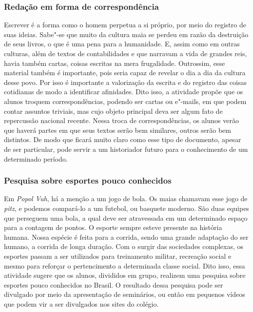 \documentclass[11pt]{extarticle}
\begin{document}
\subsubsection{Redação em forma de correspondência}


  Escrever é a forma como o homem perpetua a si próprio, por meio do
  registro de suas ideias. Sabe"-se que muito da cultura maia se perdeu
  em razão da destruição de seus livros, o que é uma pena para a
  humanidade. E, assim como em outras culturas, além de textos de
  contabilidades e que narravam a vida de grandes reis, havia também
  cartas, coisas escritas na mera frugalidade. Outrossim, esse material
  também é importante, pois seria capaz de revelar o dia a dia da
  cultura desse povo. Por isso é importante a valorização da escrita e
  do registro das coisas cotidianas de modo a identificar afinidades. Dito isso, 
  a atividade propõe que os alunos troquem correspondências, podendo ser cartas ou e"-mails, em que
  podem contar assuntos triviais, mas cujo objeto principal deva ser
  algum fato de repercussão nacional recente. Nessa troca de
  correspondências, os alunos verão que haverá partes em que seus textos
  serão bem similares, outros serão bem distintos. De modo que ficará
  muito claro como esse tipo de documento, apesar de ser particular,
  pode servir a um historiador futuro para o conhecimento de um
  determinado período.


\subsubsection{Pesquisa sobre esportes pouco conhecidos}


  Em \emph{Popol Vuh}, há a menção a um jogo de bola. Os maias chamavam
  esse jogo de \emph{pitz}, e podemos compará-lo a um futebol, ou basquete
  moderno. São duas equipes que perseguem uma bola, a qual deve ser
  atravessada em um determinado espaço para a contagem de pontos. O
  esporte sempre esteve presente na história humana. Nossa espécie é
  feita para a corrida, sendo uma grande adaptação do ser humano, a
  corrida de longa duração. Com o surgir das sociedades complexas, os
  esportes passam a ser utilizados para treinamento militar, recreação
  social e mesmo para reforçar o pertencimento a determinada classe
  social. Dito isso, essa atividade sugere que os alunos, divididos em
  grupo, realizem uma pesquisa sobre esportes pouco conhecidos no
  Brasil. O resultado dessa pesquisa pode ser divulgado por meio da
  apresentação de seminários, ou então em pequenos vídeos que podem vir
  a ser divulgados nos sites do colégio.
\end{document}
